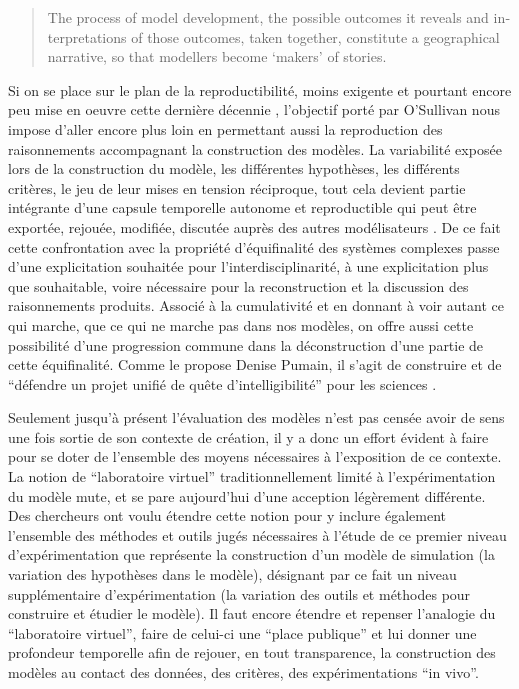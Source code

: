 \foreignblockquote{english}[\cite{OSullivan2004}]{The process of model development, the possible outcomes it reveals and interpretations of those outcomes, taken together, constitute a geographical narrative, so that modellers become ‘makers’ of stories.}

Si on se place sur le plan de la reproductibilité, moins exigente et pourtant encore peu mise en oeuvre cette dernière décennie \autocite{Wilensky2007a}, l'objectif porté par O'Sullivan nous impose d'aller encore plus loin en permettant aussi la reproduction des raisonnements accompagnant la construction des modèles. La variabilité exposée lors de la construction du modèle, les différentes hypothèses, les différents critères, le jeu de leur mises en tension réciproque, tout cela devient partie intégrante d'une capsule temporelle autonome et reproductible qui peut être exportée, rejouée, modifiée, discutée auprès des autres modélisateurs . De ce fait cette confrontation avec la propriété d'équifinalité des systèmes complexes passe d'une explicitation souhaitée pour l'interdisciplinarité, à une explicitation plus que souhaitable, voire nécessaire pour la reconstruction et la discussion des raisonnements produits. Associé à la cumulativité et en donnant à voir autant ce qui marche, que ce qui ne marche pas dans nos modèles, on offre aussi cette possibilité d'une progression commune dans la déconstruction d'une partie de cette équifinalité. Comme le propose Denise Pumain, il s'agit de construire et de \enquote{défendre un projet unifié de quête d'intelligibilité} pour les sciences \autocite[157-158]{Mathieu2014}. 

Seulement jusqu'à présent l'évaluation des modèles n'est pas censée avoir de sens une fois sortie de son contexte de création, il y a donc un effort évident à faire pour se doter de l'ensemble des moyens nécessaires à l'exposition de ce contexte. La notion de \enquote{laboratoire virtuel} traditionnellement limité à l'expérimentation du modèle mute, et se pare aujourd'hui d'une acception légèrement différente. Des chercheurs \autocites{Schmitt2014, Amblard2003} ont voulu étendre cette notion pour y inclure également l'ensemble des méthodes et outils jugés nécessaires à l'étude de ce premier niveau d'expérimentation que représente la construction d'un modèle de simulation (la variation des hypothèses dans le modèle), désignant par ce fait un niveau supplémentaire d’expérimentation (la variation des outils et méthodes pour construire et étudier le modèle).  Il faut encore étendre et repenser l'analogie du \enquote{laboratoire virtuel}, faire de celui-ci une \enquote{place publique} et lui donner une profondeur temporelle afin de rejouer, en tout transparence, la construction des modèles au contact des données, des critères, des expérimentations \foreignquote{latin}{in vivo}.

